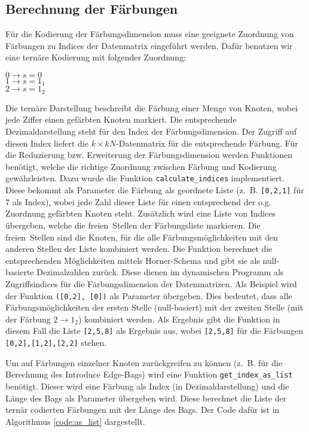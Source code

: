 \subsection{Berechnung der Färbungen}
\label{ssec:impl_colors}
Für die Kodierung der Färbungsdimension muss eine geeignete Zuordnung von Färbungen zu Indices der Datenmatrix eingeführt werden. Dafür benutzen wir eine ternäre Kodierung mit folgender Zuordnung:
\begin{center}
$0 \rightarrow s=0$\\
$1 \rightarrow s=1_1$\\
$2 \rightarrow s=1_2$\\
\end{center}
Die ternäre Darstellung beschreibt die Färbung einer Menge von Knoten, wobei jede Ziffer einen gefärbten Knoten markiert. 
Die entsprechende Dezimaldarstellung steht für den Index der Färbungsdimension. 
Der Zugriff auf diesen Index liefert die $k \times kN$-Datenmatrix für die entsprechende Färbung.
Für die Reduzierung bzw. Erweiterung der Färbungsdimension werden Funktionen benötigt, welche die richtige Zuordnung zwischen Färbung und Kodierung gewährleisten.
Dazu wurde die Funktion \texttt{calculate\_indices} implementiert. 
Diese bekommt als Parameter die Färbung als geordnete Liste (z.~B. \texttt{[0,2,1]} für 7 als Index), wobei jede Zahl dieser Liste für einen entsprechend der o.g. Zuordnung gefärbten Knoten steht. 
Zusätzlich wird eine Liste von Indices übergeben, welche die \glqq freien\grqq ~Stellen der Färbungsliste markieren. 
Die \glqq freien\grqq ~Stellen sind die Knoten, für die alle Färbungsmöglichkeiten mit den anderen Stellen der Liste kombiniert werden. 
Die Funktion berechnet die entsprechenden Möglichkeiten mittels Horner-Schema und gibt sie als null-basierte Dezimalzahlen zurück. 
Diese dienen im dynamischen Programm als Zugriffsindices für die Färbungsdimension der Datenmatrizen. 
Als Beispiel wird der Funktion \texttt{([0,2], [0])} als Parameter übergeben. 
Dies bedeutet, dass alle Färbungsmöglichkeiten der ersten Stelle (null-basiert) mit der zweiten Stelle (mit der Färbung $2 \rightarrow 1_2$) kombiniert werden. 
Als Ergebnis gibt die Funktion in diesem Fall die Liste \texttt{[2,5,8]} als Ergebnis aus, wobei \texttt{[2,5,8]} für die Färbungen \texttt{[0,2],[1,2],[2,2]} stehen.

Um auf Färbungen einzelner Knoten zurückgreifen zu können (z.~B. für die Berechnung des \glqq Introduce Edge\grqq -Bags) wird eine Funktion \texttt{get\_index\_as\_list} benötigt. Dieser wird eine Färbung als Index (in Dezimaldarstellung) und die Länge des Bags als Parameter übergeben wird. Diese berechnet die Liste der ternär codierten Färbungen mit der Länge des Bags. Der Code dafür ist in Algorithmus \ref{code:as_list} dargestellt. 

